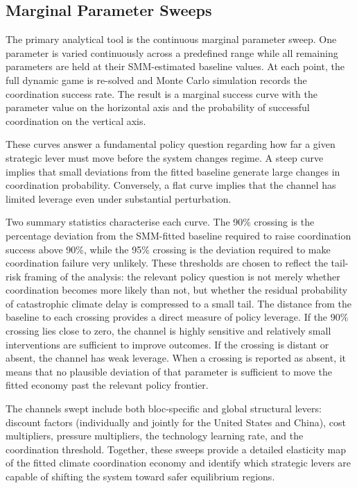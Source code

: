 \documentclass[12pt,a4paper]{article}
\begin{document}
\subsection{Marginal Parameter Sweeps}

The primary analytical tool is the continuous marginal parameter sweep. One parameter is varied continuously across a predefined range while all remaining parameters are held at their SMM-estimated baseline values. At each point, the full dynamic game is re-solved and Monte Carlo simulation records the coordination success rate. The result is a marginal success curve with the parameter value on the horizontal axis and the probability of successful coordination on the vertical axis.

These curves answer a fundamental policy question regarding how far a given strategic lever must move before the system changes regime. A steep curve implies that small deviations from the fitted baseline generate large changes in coordination probability. Conversely, a flat curve implies that the channel has limited leverage even under substantial perturbation.

Two summary statistics characterise each curve. The 90\% crossing is the percentage deviation from the SMM-fitted baseline required to raise coordination success above 90\%, while the 95\% crossing is the deviation required to make coordination failure very unlikely. These thresholds are chosen to reflect the tail-risk framing of the analysis: the relevant policy question is not merely whether coordination becomes more likely than not, but whether the residual probability of catastrophic climate delay is compressed to a small tail. The distance from the baseline to each crossing provides a direct measure of policy leverage. If the 90\% crossing lies close to zero, the channel is highly sensitive and relatively small interventions are sufficient to improve outcomes. If the crossing is distant or absent, the channel has weak leverage. When a crossing is reported as absent, it means that no plausible deviation of that parameter is sufficient to move the fitted economy past the relevant policy frontier.

The channels swept include both bloc-specific and global structural levers: discount factors (individually and jointly for the United States and China), cost multipliers, pressure multipliers, the technology learning rate, and the coordination threshold. Together, these sweeps provide a detailed elasticity map of the fitted climate coordination economy and identify which strategic levers are capable of shifting the system toward safer equilibrium regions.
\end{document}
